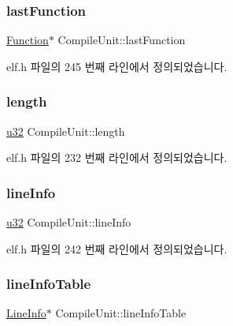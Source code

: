 \subsubsection{\texorpdfstring{last\+Function}{lastFunction}}
{\footnotesize\ttfamily \mbox{\hyperlink{struct_function}{Function}}$\ast$ Compile\+Unit\+::last\+Function}



elf.\+h 파일의 245 번째 라인에서 정의되었습니다.

\mbox{\label{struct_compile_unit_acad6384874d710baa10548c0bf9a391a}} 
\subsubsection{\texorpdfstring{length}{length}}
{\footnotesize\ttfamily \mbox{\hyperlink{_system_8h_a10e94b422ef0c20dcdec20d31a1f5049}{u32}} Compile\+Unit\+::length}



elf.\+h 파일의 232 번째 라인에서 정의되었습니다.

\mbox{\label{struct_compile_unit_a9bfc05acd5b93dec7be2a486346723db}} 
\subsubsection{\texorpdfstring{line\+Info}{lineInfo}}
{\footnotesize\ttfamily \mbox{\hyperlink{_system_8h_a10e94b422ef0c20dcdec20d31a1f5049}{u32}} Compile\+Unit\+::line\+Info}



elf.\+h 파일의 242 번째 라인에서 정의되었습니다.

\mbox{\label{struct_compile_unit_a96d38056c5c5e5e723b16980d6c34641}} 
\subsubsection{\texorpdfstring{line\+Info\+Table}{lineInfoTable}}
{\footnotesize\ttfamily \mbox{\hyperlink{struct_line_info}{Line\+Info}}$\ast$ Compile\+Unit\+::line\+Info\+Table}



